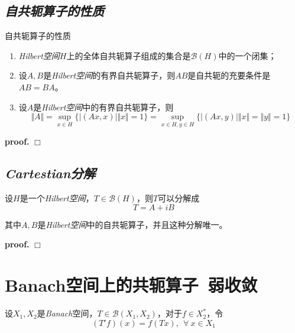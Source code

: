 \subsection*{\textsl{自共轭算子的性质}}
\begin{mdframed}
    \begin{theorem} 自共轭算子的性质
        \begin{enumerate}[itemindent=2em]
            \item \textsl{Hilbert空间}$H$上的全体自共轭算子组成的集合是$\mathcal{B}(H)$中的一个闭集；
            \item 设$A,B$是\textsl{Hilbert空间}的有界自共轭算子，则$AB$是自共轭的充要条件是$AB=BA$。
            \item 设$A$是\textsl{Hilbert空间}中的有界自共轭算子，则
            \begin{equation}
                \Vert A\Vert=\sup_{x\in H}\{|(Ax,x)|\Vert x\Vert=1\}=\sup_{x\in H,y\in H}\{|(Ax,y)|\Vert x\Vert=\Vert y\Vert=1\}
            \end{equation}
        \end{enumerate}
    \end{theorem}
\end{mdframed}
\textbf{proof.} $\Box$

\subsection*{\textsl{Cartestian分解}}

\begin{mdframed}
    \begin{theorem}
        设$H$是一个\textsl{Hilbert空间}，$T\in \mathcal{B}(H)$，则$T$可以分解成
        \begin{equation}
            T=A+iB
        \end{equation}

        其中$A,B$是\textsl{Hilbert空间}中的自共轭算子，并且这种分解唯一。
    \end{theorem}
\end{mdframed}
\textbf{proof.} $\Box$

\section{Banach空间上的共轭算子\ 弱收敛}

设$X_1,X_2$是\textsl{Banach}空间，$T\in \mathcal{B}(X_1,X_2)$，对于$f\in X^*_2$，令
\begin{equation}
    (T'f)(x)=f(Tx),\ \ \forall\ x\in X_1
\end{equation}

